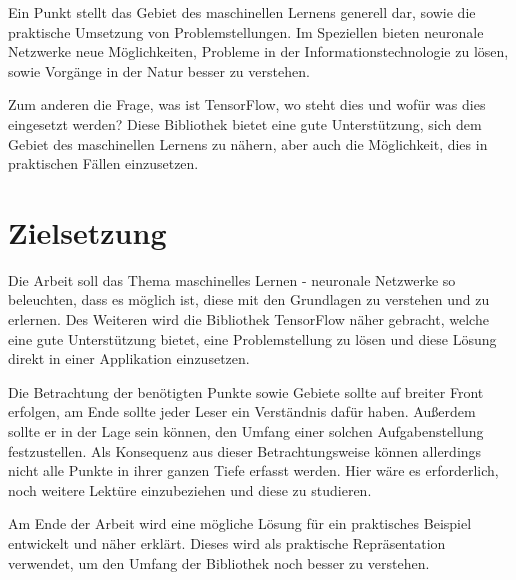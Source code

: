 \noindent
Ein Punkt stellt das Gebiet des maschinellen Lernens generell dar, sowie die praktische Umsetzung von Problemstellungen. 
Im Speziellen bieten neuronale Netzwerke neue Möglichkeiten, Probleme in der Informationstechnologie zu lösen, sowie Vorgänge in der Natur besser zu verstehen. \newline

\noindent
Zum anderen die Frage, was ist TensorFlow, wo steht dies und wofür was dies eingesetzt werden?  
Diese Bibliothek bietet eine gute Unterstützung, sich dem Gebiet des maschinellen Lernens zu nähern, aber auch die Möglichkeit, dies in praktischen Fällen einzusetzen. 


\section{Zielsetzung}


Die Arbeit soll das Thema maschinelles Lernen - neuronale Netzwerke so beleuchten, dass es möglich ist, diese mit den Grundlagen zu verstehen und zu erlernen. 
Des Weiteren wird die Bibliothek TensorFlow näher gebracht, welche eine gute Unterstützung bietet, eine Problemstellung zu lösen und diese Lösung direkt in einer Applikation einzusetzen. \newline

\noindent
Die Betrachtung der benötigten Punkte sowie Gebiete sollte auf breiter Front erfolgen, am Ende sollte jeder Leser ein Verständnis dafür haben. 
Außerdem sollte er in der Lage sein können, den Umfang einer solchen Aufgabenstellung festzustellen. 
Als Konsequenz aus dieser Betrachtungsweise können allerdings nicht alle Punkte in ihrer ganzen Tiefe erfasst werden. 
Hier wäre es erforderlich, noch weitere Lektüre einzubeziehen und diese zu studieren. \newline

\noindent
Am Ende der Arbeit wird eine mögliche Lösung für ein praktisches Beispiel entwickelt und näher erklärt.
Dieses wird als praktische Repräsentation verwendet, um den Umfang der Bibliothek noch besser zu verstehen. \newline

